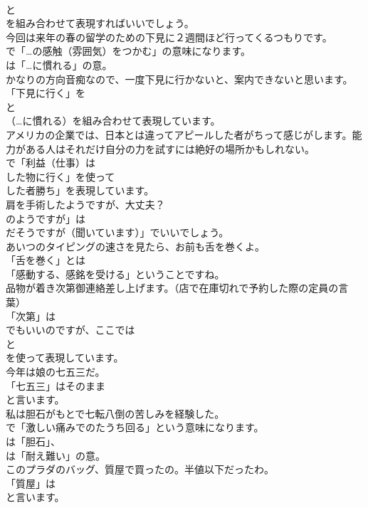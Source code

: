 \documentclass[8pt]{extreport}
\begin{document}
\begin{CJK}{UTF8}{min}
\\	と
\\	を組み合わせて表現すればいいでしょう。	
\\	今回は来年の春の留学のための下見に２週間ほど行ってくるつもりです。 
\\	で「…の感触（雰囲気）をつかむ」の意味になります。
\\	は「…に慣れる」の意。	
\\	かなりの方向音痴なので、一度下見に行かないと、案内できないと思います。 
\\	「下見に行く」を 
\\	と 
\\	（…に慣れる）を組み合わせて表現しています。	
\\	アメリカの企業では、日本とは違ってアピールした者がちって感じがします。能力がある人はそれだけ自分の力を試すには絶好の場所かもしれない。 
\\	で「利益（仕事）は 
\\	した物に行く」を使って
\\	した者勝ち」を表現しています。	
\\	肩を手術したようですが、大丈夫？ 
\\	のようですが」は
\\	だそうですが（聞いています）」でいいでしょう。	
\\	あいつのタイピングの速さを見たら、お前も舌を巻くよ。 
\\	「舌を巻く」とは
\\	「感動する、感銘を受ける」ということですね。	
\\	品物が着き次第御連絡差し上げます。（店で在庫切れで予約した際の定員の言葉） 
\\	「次第」は
\\	でもいいのですが、ここでは
\\	と
\\	を使って表現しています。	
\\	今年は娘の七五三だ。 
\\	「七五三」はそのまま
\\	と言います。	
\\	私は胆石がもとで七転八倒の苦しみを経験した。 
\\	で「激しい痛みでのたうち回る」という意味になります。
\\	は「胆石」、
\\	は「耐え難い」の意。	
\\	このプラダのバッグ、質屋で買ったの。半値以下だったわ。 
\\	「質屋」は
\\	と言います。

\end{CJK}
\end{document}

